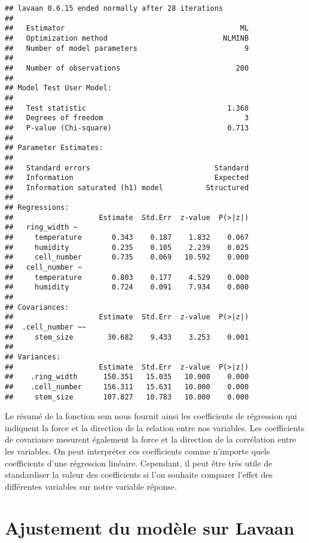 \documentclass[
]{article}
\begin{document}
\begin{verbatim}
## lavaan 0.6.15 ended normally after 28 iterations
## 
##   Estimator                                         ML
##   Optimization method                           NLMINB
##   Number of model parameters                         9
## 
##   Number of observations                           200
## 
## Model Test User Model:
##                                                       
##   Test statistic                                 1.368
##   Degrees of freedom                                 3
##   P-value (Chi-square)                           0.713
## 
## Parameter Estimates:
## 
##   Standard errors                             Standard
##   Information                                 Expected
##   Information saturated (h1) model          Structured
## 
## Regressions:
##                    Estimate  Std.Err  z-value  P(>|z|)
##   ring_width ~                                        
##     temperature       0.343    0.187    1.832    0.067
##     humidity          0.235    0.105    2.239    0.025
##     cell_number       0.735    0.069   10.592    0.000
##   cell_number ~                                       
##     temperature       0.803    0.177    4.529    0.000
##     humidity          0.724    0.091    7.934    0.000
## 
## Covariances:
##                    Estimate  Std.Err  z-value  P(>|z|)
##  .cell_number ~~                                      
##     stem_size        30.682    9.433    3.253    0.001
## 
## Variances:
##                    Estimate  Std.Err  z-value  P(>|z|)
##    .ring_width      150.351   15.035   10.000    0.000
##    .cell_number     156.311   15.631   10.000    0.000
##     stem_size       107.827   10.783   10.000    0.000
\end{verbatim}

Le résumé de la fonction sem nous fournit ainsi les coefficients de
régression qui indiquent la force et la direction de la relation entre
nos variables. Les coefficients de covariance mesurent également la
force et la direction de la corrélation entre les variables. On peut
interpréter ces coefficients comme n'importe quels coefficients d'une
régression linéaire. Cependant, il peut être très utile de standardiser
la valeur des coefficients si l'on souhaite comparer l'effet des
différentes variables sur notre variable réponse.

\hypertarget{ajustement-du-moduxe8le-sur-lavaan}{%
\section{Ajustement du modèle sur
Lavaan}\label{ajustement-du-moduxe8le-sur-lavaan}}
\end{document}
